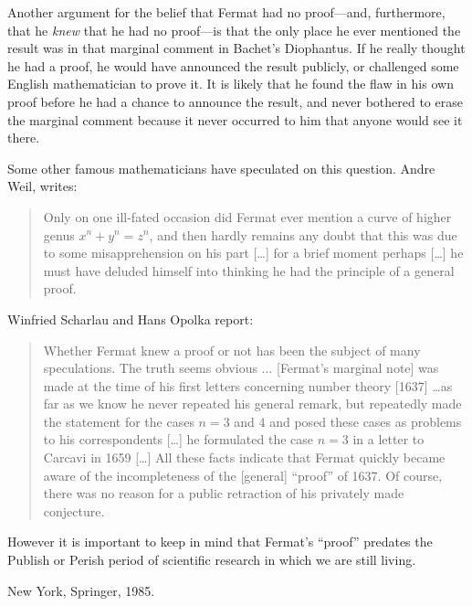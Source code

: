 Another argument for the belief that Fermat had no proof---and,
furthermore, that he \emph{knew} that he had no proof---is that the only
place he ever mentioned the result was in that marginal comment in
Bachet's Diophantus. If he really thought he had a proof, he would have
announced the result publicly, or challenged some English mathematician
to prove it. It is likely that he found the flaw in his own proof before
he had a chance to announce the result, and never bothered to erase the
marginal comment because it never occurred to him that anyone would see
it there.

Some other famous mathematicians have speculated on this question.
Andre Weil, writes:
\begin{quote}
  Only on one ill-fated occasion did Fermat ever mention a curve of
  higher genus $x^n+y^n = z^n$, and then hardly remains any doubt that
  this was due to some misapprehension on his part [\ldots] for a
  brief moment perhaps [\ldots] he must have deluded himself into
  thinking he had the principle of a general proof.
\end{quote}

Winfried Scharlau and Hans Opolka report:
\begin{quote}
  Whether Fermat knew a proof or not has been the subject of many
  speculations.  The truth seems obvious $\ldots$ [Fermat's marginal
  note] was made at the time of his first letters concerning number
  theory [1637] \ldots as far as we know he never repeated his general
  remark, but repeatedly made the statement for the cases $n=3$ and $4$
  and posed these cases as problems to his correspondents [\ldots] he
  formulated the case $n=3$ in a letter to Carcavi in 1659 [\ldots]
  All these facts indicate that Fermat quickly became aware of the
  incompleteness of the [general] ``proof'' of 1637.  Of course, there
  was no reason for a public retraction of his privately made
  conjecture.
\end{quote}

However it is important to keep in mind that Fermat's ``proof'' predates
the Publish or Perish period of scientific research in which we are
still living.

\Ref

  {New
  York, Springer, 1985.}


